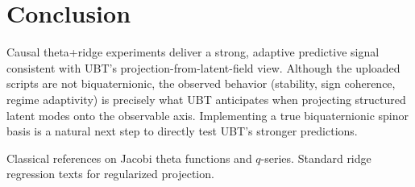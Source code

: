 \documentclass[11pt,a4paper]{article}
\begin{document}
\section{Conclusion}
Causal theta+ridge experiments deliver a strong, adaptive predictive signal consistent with UBT's projection-from-latent-field view. Although the uploaded scripts are not biquaternionic, the observed behavior (stability, sign coherence, regime adaptivity) is precisely what UBT anticipates when projecting structured latent modes onto the observable axis. Implementing a true biquaternionic spinor basis is a natural next step to directly test UBT's stronger predictions.


\begin{thebibliography}{9}
 Classical references on Jacobi theta functions and $q$-series.
 Standard ridge regression texts for regularized projection.
\end{thebibliography}
\end{document}
